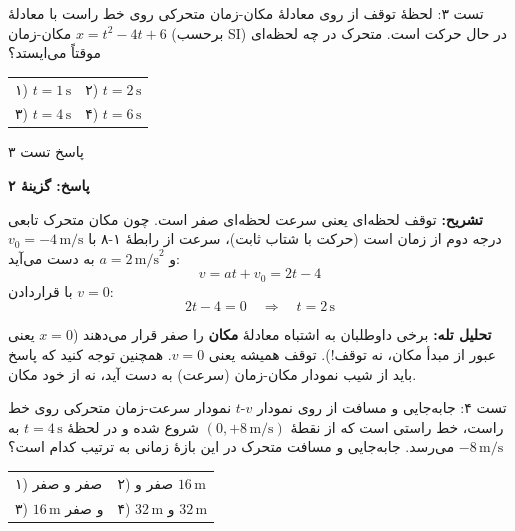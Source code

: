 \documentclass[12pt, a4paper]{article}
\begin{document}
\vspace{0.25cm}

\begin{exambox}{تست ۳: لحظهٔ توقف از روی معادلهٔ مکان-زمان}
متحرکی روی خط راست با معادلهٔ مکان-زمان $x = t^2 - 4t + 6$ (برحسب SI) در حال حرکت است. متحرک در چه لحظه‌ای موقتاً می‌ایستد؟

\begin{center}
\begin{tabular}{p{7cm} p{7cm}}
۱) $t = 1\,\text{s}$ & ۲) $t = 2\,\text{s}$ \\[0.35cm]
۳) $t = 4\,\text{s}$ & ۴) $t = 6\,\text{s}$ \\
\end{tabular}
\end{center}
\end{exambox}

\begin{answerbox}{پاسخ تست ۳}

\textbf{پاسخ: گزینهٔ ۲}

\textbf{تشریح:} توقف لحظه‌ای یعنی سرعت لحظه‌ای صفر است. چون مکان متحرک تابعی درجه دوم از زمان است (حرکت با شتاب ثابت)، سرعت از رابطهٔ ۱-۸ با $v_0 = -4\,\text{m/s}$ و $a = 2\,\text{m/s}^2$ به دست می‌آید:
\[
v = at + v_0 = 2t - 4
\]
با قراردادن $v = 0$:
\[
2t - 4 = 0 \quad \Longrightarrow \quad t = 2\,\text{s}
\]

\textbf{تحلیل تله:} برخی داوطلبان به اشتباه معادلهٔ \textbf{مکان} را صفر قرار می‌دهند ($x=0$ یعنی عبور از مبدأ مکان، نه توقف!). توقف همیشه یعنی $v=0$. همچنین توجه کنید که پاسخ باید از شیب نمودار مکان-زمان (سرعت) به دست آید، نه از خود مکان.
\end{answerbox}

\vspace{0.25cm}

\begin{exambox}{تست ۴: جابه‌جایی و مسافت از روی نمودار $v$-$t$}
نمودار سرعت-زمان متحرکی روی خط راست، خط راستی است که از نقطهٔ $(0, +8\,\text{m/s})$ شروع شده و در لحظهٔ $t = 4\,\text{s}$ به $-8\,\text{m/s}$ می‌رسد. جابه‌جایی و مسافت متحرک در این بازهٔ زمانی به ترتیب کدام است؟

\begin{center}
\begin{tabular}{p{7cm} p{7cm}}
۱) صفر و صفر & ۲) صفر و $16\,\text{m}$ \\[0.35cm]
۳) $16\,\text{m}$ و صفر & ۴) $32\,\text{m}$ و $32\,\text{m}$ \\
\end{tabular}
\end{center}
\end{exambox}
\end{document}
